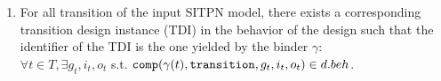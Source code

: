 \begin{definition}
\begin{enumerate}[resume]
    

  \item For all transition of the input SITPN model, there exists a
    corresponding transition design instance (TDI) in the behavior of
    the \hvhdl{} design such that the identifier of the TDI is the one
    yielded
    by the binder $\gamma$:\\
    $\forall{}t\in{}T,\exists{}g_t,i_t,o_t$ s.t. $\mathtt{comp}(\gamma(t),\mathtt{transition},g_t,i_t,o_t)\in{}d.beh$.
    

\end{enumerate}
\end{definition}
